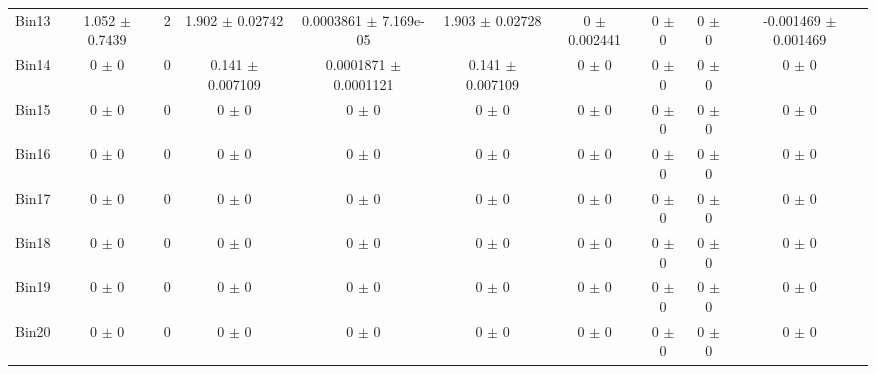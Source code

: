 \begin{tabular}{@{\extracolsep{4pt}}lccccccccc@{}}
     Bin13 & 1.052 $\pm$ 0.7439 & 2 & 1.902 $\pm$ 0.02742 & 0.0003861 $\pm$ 7.169e-05 & 1.903 $\pm$ 0.02728 & 0 $\pm$ 0.002441 & 0 $\pm$ 0 & 0 $\pm$ 0 & -0.001469 $\pm$ 0.001469 \\ 
     Bin14 & 0 $\pm$ 0 & 0 & 0.141 $\pm$ 0.007109 & 0.0001871 $\pm$ 0.0001121 & 0.141 $\pm$ 0.007109 & 0 $\pm$ 0 & 0 $\pm$ 0 & 0 $\pm$ 0 & 0 $\pm$ 0 \\ 
     Bin15 & 0 $\pm$ 0 & 0 & 0 $\pm$ 0 & 0 $\pm$ 0 & 0 $\pm$ 0 & 0 $\pm$ 0 & 0 $\pm$ 0 & 0 $\pm$ 0 & 0 $\pm$ 0 \\ 
     Bin16 & 0 $\pm$ 0 & 0 & 0 $\pm$ 0 & 0 $\pm$ 0 & 0 $\pm$ 0 & 0 $\pm$ 0 & 0 $\pm$ 0 & 0 $\pm$ 0 & 0 $\pm$ 0 \\ 
     Bin17 & 0 $\pm$ 0 & 0 & 0 $\pm$ 0 & 0 $\pm$ 0 & 0 $\pm$ 0 & 0 $\pm$ 0 & 0 $\pm$ 0 & 0 $\pm$ 0 & 0 $\pm$ 0 \\ 
     Bin18 & 0 $\pm$ 0 & 0 & 0 $\pm$ 0 & 0 $\pm$ 0 & 0 $\pm$ 0 & 0 $\pm$ 0 & 0 $\pm$ 0 & 0 $\pm$ 0 & 0 $\pm$ 0 \\ 
     Bin19 & 0 $\pm$ 0 & 0 & 0 $\pm$ 0 & 0 $\pm$ 0 & 0 $\pm$ 0 & 0 $\pm$ 0 & 0 $\pm$ 0 & 0 $\pm$ 0 & 0 $\pm$ 0 \\ 
     Bin20 & 0 $\pm$ 0 & 0 & 0 $\pm$ 0 & 0 $\pm$ 0 & 0 $\pm$ 0 & 0 $\pm$ 0 & 0 $\pm$ 0 & 0 $\pm$ 0 & 0 $\pm$ 0 \\ 
\hline\hline
  \end{tabular}
